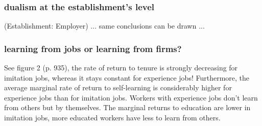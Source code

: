 \documentclass[12pt,a4paper]{article}
\begin{document}
  \subsubsection{dualism at the establishment's level} %
  \label{ssub:dualism at the establishment's level}
  (Establishment: Employer) ... same conclusions can be drawn ...

  \subsubsection{learning from jobs or learning from firms?} %
  \label{ssub:learning from jobs or learning from firms?}
  See figure 2 (p. 935), the rate of return to tenure is strongly decreasing for imitation jobs,
  whereas it stays constant for experience jobs! Furthermore, the average marginal rate of return to
  self-learning is considerably higher for experience jobs than for imitation jobs. Workers with
  experience jobs don't learn from others but by themselves. The marginal returns to education are
  lower in imitation jobs, more educated workers have less to learn from others.
\end{document}
